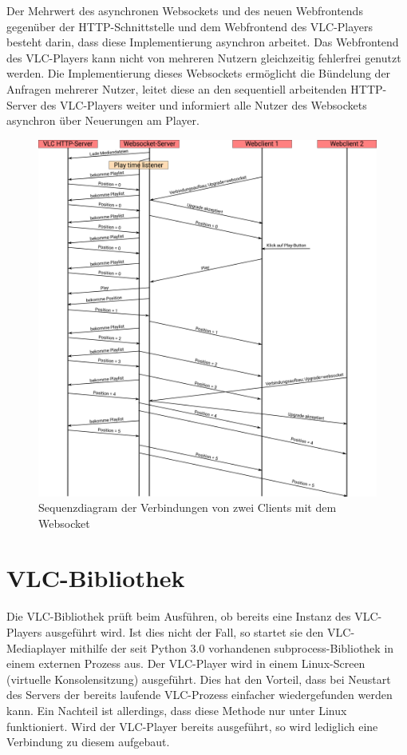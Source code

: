 \documentclass[12pt,a4paper,hidelinks]{scrreprt}
\begin{document}
	Der Mehrwert des asynchronen Websockets und des neuen Webfrontends gegenüber der HTTP-Schnittstelle und dem Webfrontend des VLC-Players besteht darin, dass diese Implementierung asynchron arbeitet.
	Das Webfrontend des VLC-Players kann nicht von mehreren Nutzern gleichzeitig fehlerfrei genutzt werden. Die Implementierung dieses Websockets ermöglicht die Bündelung der Anfragen mehrerer Nutzer, leitet diese an den sequentiell arbeitenden HTTP-Server des VLC-Players weiter und informiert alle Nutzer des Websockets asynchron über Neuerungen am Player.
	\newpage
	\begin{figure}[H]
	\centering
	\includegraphics[width=\linewidth]{img/conections_overview}
	\caption{Sequenzdiagram der Verbindungen von zwei Clients mit dem Websocket}
	\label{fig:conectionsoverview}
	\end{figure}
	\newpage
	

\section{VLC-Bibliothek}\label{sec:vlclib}
	Die VLC-Bibliothek prüft beim Ausführen, ob bereits eine Instanz des VLC-Players ausgeführt wird. Ist dies nicht der Fall, so startet sie den VLC-Mediaplayer mithilfe der seit Python 3.0 vorhandenen subprocess-Bibliothek in einem externen Prozess aus. Der VLC-Player wird in einem Linux-Screen (virtuelle Konsolensitzung) ausgeführt. Dies hat den Vorteil, dass bei Neustart des Servers der bereits laufende VLC-Prozess einfacher wiedergefunden werden kann. Ein Nachteil ist allerdings, dass diese Methode nur unter Linux funktioniert. Wird der VLC-Player bereits ausgeführt, so wird lediglich eine Verbindung zu diesem aufgebaut.
	
\end{document}
